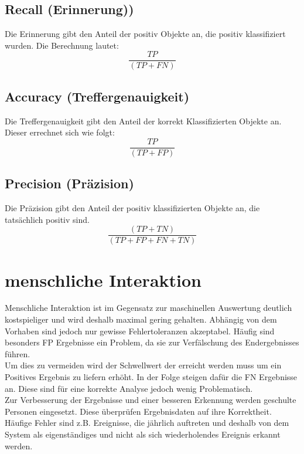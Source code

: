 \documentclass[twoside,a4paper]{article}
\begin{document}
\subsection{Recall (Erinnerung))}
Die Erinnerung gibt den Anteil der positiv Objekte an, die positiv klassifiziert wurden. Die Berechnung lautet:
$$\frac{TP}{(TP+FN)}$$

\subsection{Accuracy (Treffergenauigkeit)}
Die Treffergenauigkeit gibt den Anteil der korrekt Klassifizierten Objekte an. Dieser errechnet sich wie folgt:
$$\frac{TP}{(TP+FP)}$$

\subsection{Precision (Präzision)}
Die Präzision gibt den Anteil der positiv klassifizierten Objekte an, die tatsächlich positiv sind.
$$\frac{(TP+TN)}{(TP+FP+FN+TN)}$$

\section{menschliche Interaktion}
Menschliche Interaktion ist im Gegensatz zur maschinellen Auswertung deutlich kostspieliger und wird deshalb maximal gering gehalten. Abhängig von dem Vorhaben sind jedoch nur gewisse Fehlertoleranzen akzeptabel. Häufig sind besonders FP Ergebnisse ein Problem, da sie zur Verfälschung des Endergebnisses führen.\\
Um dies zu vermeiden wird der Schwellwert der erreicht werden muss um ein Positives Ergebnis zu liefern erhöht. In der Folge steigen dafür die FN Ergebnisse an. Diese sind für eine korrekte Analyse jedoch wenig Problematisch.\\
Zur Verbesserung der Ergebnisse und einer besseren Erkennung werden geschulte Personen eingesetzt. Diese überprüfen Ergebnisdaten auf ihre Korrektheit. Häufige Fehler sind z.B. Ereignisse, die jährlich auftreten und deshalb von dem System als eigenständiges und nicht als sich wiederholendes Ereignis erkannt werden.
\end{document}
